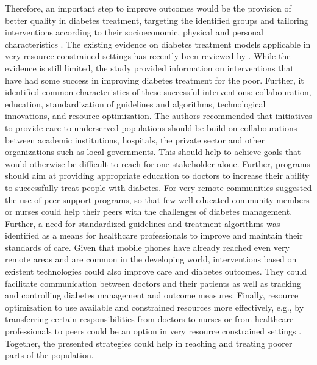 Therefore, an important step to improve outcomes would be the provision of better quality in diabetes treatment, targeting the identified groups and tailoring interventions according to their socioeconomic, physical and personal characteristics \parencite{Cefalu2016}. The existing evidence on diabetes treatment models applicable in very resource constrained settings has recently been reviewed by \textcite{Esterson2014}. While the evidence is still limited, the study provided information on interventions that have had some success in improving diabetes treatment for the poor. Further, it identified common characteristics of these successful interventions: collabouration, education, standardization of guidelines and algorithms, technological innovations, and resource optimization. The authors recommended that initiatives to provide care to underserved populations should be build on collabourations between academic institutions, hospitals, the private sector and other organizations such as local governments. This should help to achieve goals that would otherwise be difficult to reach for one stakeholder alone. Further, programs should aim at providing appropriate education to doctors to increase their ability to successfully treat people with diabetes. For very remote communities \textcite{Esterson2014} suggested the use of peer-support programs, so that few well educated community members or nurses could help their peers with the challenges of diabetes management. Further, a need for standardized guidelines and treatment algorithms was identified as a means for healthcare professionals to improve and maintain their standards of care. Given that mobile phones have already reached even very remote areas and are common in the developing world, interventions based on existent technologies could also improve care and diabetes outcomes. They could facilitate communication between doctors and their patients as well as tracking and controlling diabetes management and outcome measures. Finally, resource optimization to use available and constrained resources more effectively, e.g., by transferring certain responsibilities from doctors to nurses or from healthcare professionals to peers could be an option in very resource constrained settings \parencite{Esterson2014}. Together, the presented strategies could help in reaching and treating poorer parts of the population.

